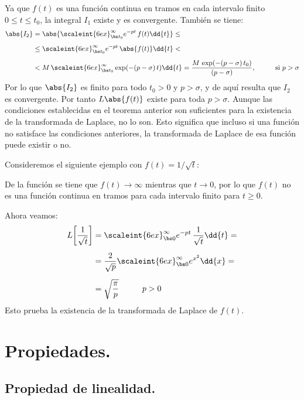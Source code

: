 Ya que $f (t)$ es una función continua en tramos en cada intervalo finito $0 \leq t \leq t_{0}$, la integral $I_{1}$ existe y es convergente. También se tiene:
\begin{align*}
\abs{I_{2}} &= \abs{\scaleint{6ex}_{\bs t_{0}}^{\infty} e^{- p t} \, f (t) \dd{t}} \leq \\[0.5em]
&\leq \scaleint{6ex}_{\bs t_{0}}^{\infty} e^{- p t} \, \abs{f (t)} \dd{t} < \\[0.5em]
&< M \, \scaleint{6ex}_{\bs t_{0}}^{\infty} \exp(-(p - \sigma) \, t) \dd{t} = \dfrac{M \, \exp(-(p - \sigma) \, t_{0})}{(p - \sigma)}, \hspace{1cm} \mbox{si  } p > \sigma
\end{align*}
Por lo que $\abs{I_{2}}$ es finito para todo $t_{0} > 0$ y $p > \sigma$, y de aquí resulta que $I_{2}$ es convergente. Por tanto $L\abs{f (t)}$ existe para toda $p > \sigma$.
Aunque las condiciones establecidas en el teorema anterior son suficientes para la existencia de la transformada de Laplace, no lo son. Esto significa que incluso si una función no satisface las condiciones anteriores, la transformada de Laplace de esa función puede existir o no. 
\par
Consideremos el siguiente ejemplo con $f (t) = 1 / \sqrt{t}$:
\par
De la función se tiene que $f (t) \to \infty$ mientras que $t \to 0$, por lo que $f (t)$ no es una función continua en tramos para cada intervalo finito para $t \geq 0$.
\par
Ahora veamos:
\begin{align*}
L \bigg[ \dfrac{1}{\sqrt{t}} \bigg] &= \scaleint{6ex}_{\bs 0}^{\infty} e^{-p t} \, \dfrac{1}{\sqrt{t}} \dd{t} = \\[0.5em]
&= \dfrac{2}{\sqrt{p}} \scaleint{6ex}_{\bs 0}^{\infty} e^{x^{2}} \dd{x} = \\[0.5em]
&= \sqrt{\dfrac{\pi}{p}} \hspace{1cm} p > 0
\end{align*}
Esto prueba la existencia de la transformada de Laplace de $f (t)$.

\section{Propiedades.}

\subsection{Propiedad de linealidad.}

